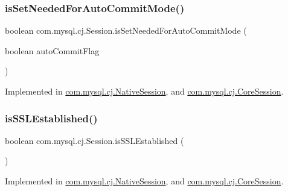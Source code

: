 \subsubsection{\texorpdfstring{is\+Set\+Needed\+For\+Auto\+Commit\+Mode()}{isSetNeededForAutoCommitMode()}}
{\footnotesize\ttfamily boolean com.\+mysql.\+cj.\+Session.\+is\+Set\+Needed\+For\+Auto\+Commit\+Mode (\begin{DoxyParamCaption}\item[{boolean}]{auto\+Commit\+Flag }\end{DoxyParamCaption})}



Implemented in \mbox{\hyperlink{classcom_1_1mysql_1_1cj_1_1_native_session_a6c17459969e6753f0b81ebe4ad6dfeea}{com.\+mysql.\+cj.\+Native\+Session}}, and \mbox{\hyperlink{classcom_1_1mysql_1_1cj_1_1_core_session_a126e95932ffb8fdf73b7c4ae4d43972b}{com.\+mysql.\+cj.\+Core\+Session}}.

\mbox{\label{interfacecom_1_1mysql_1_1cj_1_1_session_a495638620a1d409d7da49b3cedf0e41d}} 
\subsubsection{\texorpdfstring{is\+S\+S\+L\+Established()}{isSSLEstablished()}}
{\footnotesize\ttfamily boolean com.\+mysql.\+cj.\+Session.\+is\+S\+S\+L\+Established (\begin{DoxyParamCaption}{ }\end{DoxyParamCaption})}



Implemented in \mbox{\hyperlink{classcom_1_1mysql_1_1cj_1_1_native_session_a0cb179e160997c904bc69c9f4a027433}{com.\+mysql.\+cj.\+Native\+Session}}, and \mbox{\hyperlink{classcom_1_1mysql_1_1cj_1_1_core_session_ae1223b9bea2fae5aa55cc356aab2c079}{com.\+mysql.\+cj.\+Core\+Session}}.

\mbox{\label{interfacecom_1_1mysql_1_1cj_1_1_session_aa427397e1aec0d100dcfbdbf8aba74bd}} 
